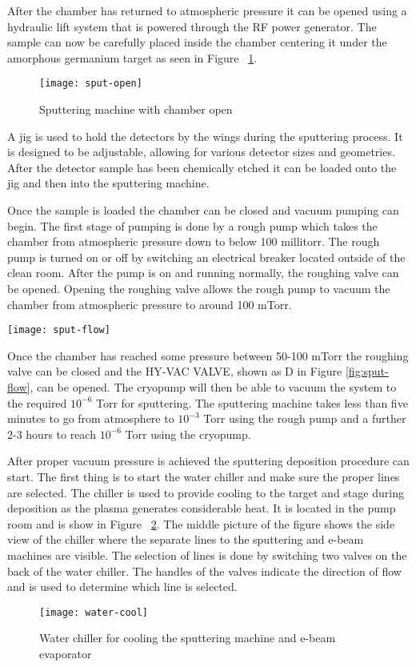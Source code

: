 After the chamber has returned to atmospheric pressure it can be opened using a hydraulic lift system that is powered through the RF power generator.
The sample can now be carefully placed inside the chamber centering it under the amorphous germanium target as seen in Figure ~\ref{fig:sput-open}.
\begin{figure}[htpb]
\centering
\texttt{[image: sput-open]}
\caption{Sputtering machine with chamber open}
\label{fig:sput-open}
\end{figure}
A jig is used to hold the detectors by the wings during the sputtering process.
It is designed to be adjustable, allowing for various detector sizes and geometries.
After the detector sample has been chemically etched it can be loaded onto the jig and then into the sputtering machine.

Once the sample is loaded the chamber can be closed and vacuum pumping can begin.
The first stage of pumping is done by a rough pump which takes the chamber from atmospheric pressure down to below 100 millitorr.
The rough pump is turned on or off by switching an electrical breaker located outside of the clean room.
After the pump is on and running normally, the roughing valve can be opened.
Opening the roughing valve allows the rough pump to vacuum the chamber from atmospheric pressure to around 100 mTorr.

\begin{sidewaysfigure}
\texttt{[image: sput-flow]}
\caption{This is a diagram of the Sputtering machine vacuum and gas system. Each valve is connected to a pressurized air line.}
\label{fig:sput-flow}
\end{sidewaysfigure}

Once the chamber has reached some pressure between 50-100 mTorr the roughing valve can be closed and the HY-VAC VALVE, shown as D in Figure \ref{fig:sput-flow}, can be opened.
The cryopump will then be able to vacuum the system to the required $10^{-6}$ Torr for sputtering.
The sputtering machine takes less than five minutes to go from atmosphere to $10^{-3}$ Torr using the rough pump and a further 2-3 hours to reach $10^{-6}$ Torr using the cryopump.

After proper vacuum pressure is achieved the sputtering deposition procedure can start.
The first thing is to start the water chiller and make sure the proper lines are selected.
The chiller is used to provide cooling to the target and stage during deposition as the plasma generates considerable heat.
It is located in the pump room and is show in Figure ~\ref{fig:water-cool}.
The middle picture of the figure shows the side view of the chiller where the separate lines to the sputtering and e-beam machines are visible.
The selection of lines is done by switching two valves on the back of the water chiller.
The handles of the valves indicate the direction of flow and is used to determine which line is selected.
\begin{figure}[htpb]
\centering
\texttt{[image: water-cool]}
\caption{Water chiller for cooling the sputtering machine and e-beam evaporator}
\label{fig:water-cool}
\end{figure}

